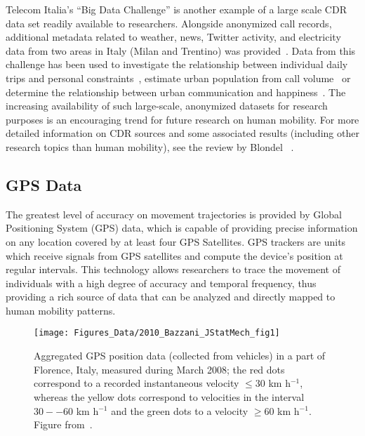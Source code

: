 Telecom Italia's ``Big Data Challenge'' is another example of a large scale CDR data set readily available to researchers. Alongside anonymized call records, additional metadata related to weather, news, Twitter activity, and electricity data from two areas in Italy (Milan and Trentino) was provided~\cite{barlacchi_2015_multi}. Data from this challenge has been used to investigate the relationship between individual daily trips and personal constraints~\cite{de_2015_personalized}, estimate urban population from call volume~\cite{douglass_2015_high} or determine the relationship between urban communication and happiness~\cite{alshamsi_2015_misery}. The increasing availability of such large-scale, anonymized datasets for research purposes is an encouraging trend for future research on human mobility. For more detailed information on CDR sources and some associated results (including other research topics than human mobility), see the review by Blondel \et~\cite{Blondel_2015_CDRreview}.

\subsection{GPS Data}
\label{sec:gps}

The greatest level of accuracy on movement trajectories is provided by Global Positioning System (GPS) data, which is capable of providing precise information on any location covered by at least four GPS Satellites. GPS trackers are units which receive signals from GPS satellites and compute the device's position at regular intervals. This technology allows researchers to trace the movement of individuals with a high degree of accuracy and temporal frequency, thus providing a rich source of data that can be analyzed and directly mapped to human mobility patterns.

\begin{figure}[t!]
\centering
\texttt{[image: Figures\_Data/2010\_Bazzani\_JStatMech\_fig1]}
\caption{Aggregated GPS position data (collected from vehicles) in a part of Florence, Italy,  measured during March 2008; the red dots correspond to a recorded instantaneous velocity $\leq30$ km h$^{-1}$, whereas the yellow dots correspond to velocities in the interval $30--60$ km h$^{-1}$ and the green dots to a velocity $\geq60$ km h$^{-1}$. Figure from~\cite{bazzani_2010_statistical_arxiv}.}
\label{fig:2010_Bazzani_JStatMech_fig1}
\end{figure}

